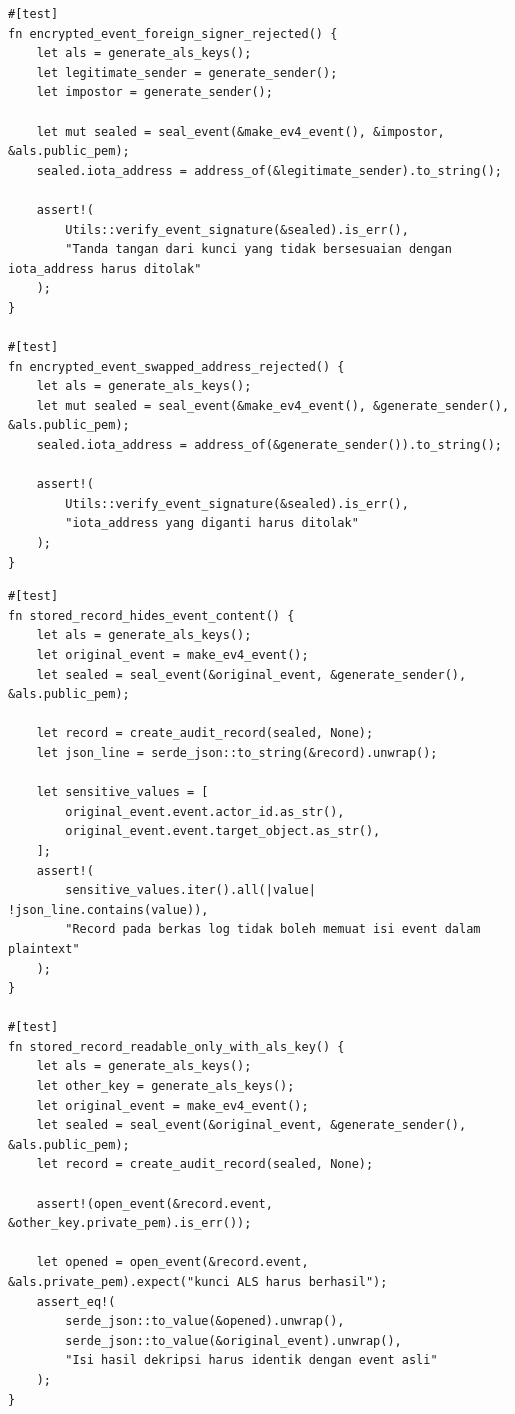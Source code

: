 \begin{listing}[ht]
\begin{verbatim}
#[test]
fn encrypted_event_foreign_signer_rejected() {
    let als = generate_als_keys();
    let legitimate_sender = generate_sender();
    let impostor = generate_sender();
 
    let mut sealed = seal_event(&make_ev4_event(), &impostor, &als.public_pem);
    sealed.iota_address = address_of(&legitimate_sender).to_string();
 
    assert!(
        Utils::verify_event_signature(&sealed).is_err(),
        "Tanda tangan dari kunci yang tidak bersesuaian dengan iota_address harus ditolak"
    );
}
 
#[test]
fn encrypted_event_swapped_address_rejected() {
    let als = generate_als_keys();
    let mut sealed = seal_event(&make_ev4_event(), &generate_sender(), &als.public_pem);
    sealed.iota_address = address_of(&generate_sender()).to_string();
 
    assert!(
        Utils::verify_event_signature(&sealed).is_err(),
        "iota_address yang diganti harus ditolak"
    );
}
\end{verbatim}
\caption{Pengujian P-KNF-08: keaslian pengirim}
\label{code:p-knf-08}
\end{listing}
 
\begin{listing}[ht]
\begin{verbatim}
#[test]
fn stored_record_hides_event_content() {
    let als = generate_als_keys();
    let original_event = make_ev4_event();
    let sealed = seal_event(&original_event, &generate_sender(), &als.public_pem);
 
    let record = create_audit_record(sealed, None);
    let json_line = serde_json::to_string(&record).unwrap();
 
    let sensitive_values = [
        original_event.event.actor_id.as_str(),
        original_event.event.target_object.as_str(),
    ];
    assert!(
        sensitive_values.iter().all(|value| !json_line.contains(value)),
        "Record pada berkas log tidak boleh memuat isi event dalam plaintext"
    );
}
 
#[test]
fn stored_record_readable_only_with_als_key() {
    let als = generate_als_keys();
    let other_key = generate_als_keys();
    let original_event = make_ev4_event();
    let sealed = seal_event(&original_event, &generate_sender(), &als.public_pem);
    let record = create_audit_record(sealed, None);
 
    assert!(open_event(&record.event, &other_key.private_pem).is_err());
 
    let opened = open_event(&record.event, &als.private_pem).expect("kunci ALS harus berhasil");
    assert_eq!(
        serde_json::to_value(&opened).unwrap(),
        serde_json::to_value(&original_event).unwrap(),
        "Isi hasil dekripsi harus identik dengan event asli"
    );
}
\end{verbatim}
\caption{Pengujian P-KNF-09: kerahasiaan isi \textit{event} pada \textit{audit record}}
\label{code:p-knf-09}
\end{listing}